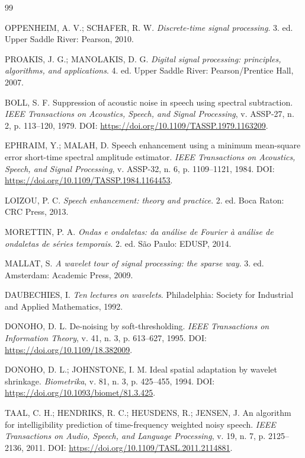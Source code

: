 \newpage
{}
\begin{thebibliography}{99}

 OPPENHEIM, A. V.; SCHAFER, R. W. \textit{Discrete-time signal processing}. 3. ed. Upper Saddle River: Pearson, 2010.

 PROAKIS, J. G.; MANOLAKIS, D. G. \textit{Digital signal processing: principles, algorithms, and applications}. 4. ed. Upper Saddle River: Pearson/Prentice Hall, 2007.

 BOLL, S. F. Suppression of acoustic noise in speech using spectral subtraction. \textit{IEEE Transactions on Acoustics, Speech, and Signal Processing}, v. ASSP-27, n. 2, p. 113--120, 1979. DOI: \url{https://doi.org/10.1109/TASSP.1979.1163209}.

 EPHRAIM, Y.; MALAH, D. Speech enhancement using a minimum mean-square error short-time spectral amplitude estimator. \textit{IEEE Transactions on Acoustics, Speech, and Signal Processing}, v. ASSP-32, n. 6, p. 1109--1121, 1984. DOI: \url{https://doi.org/10.1109/TASSP.1984.1164453}.

 LOIZOU, P. C. \textit{Speech enhancement: theory and practice}. 2. ed. Boca Raton: CRC Press, 2013.

 MORETTIN, P. A. \textit{Ondas e ondaletas: da análise de Fourier à análise de ondaletas de séries temporais}. 2. ed. São Paulo: EDUSP, 2014.

 MALLAT, S. \textit{A wavelet tour of signal processing: the sparse way}. 3. ed. Amsterdam: Academic Press, 2009.

 DAUBECHIES, I. \textit{Ten lectures on wavelets}. Philadelphia: Society for Industrial and Applied Mathematics, 1992.

 DONOHO, D. L. De-noising by soft-thresholding. \textit{IEEE Transactions on Information Theory}, v. 41, n. 3, p. 613--627, 1995. DOI: \url{https://doi.org/10.1109/18.382009}.

 DONOHO, D. L.; JOHNSTONE, I. M. Ideal spatial adaptation by wavelet shrinkage. \textit{Biometrika}, v. 81, n. 3, p. 425--455, 1994. DOI: \url{https://doi.org/10.1093/biomet/81.3.425}.

 TAAL, C. H.; HENDRIKS, R. C.; HEUSDENS, R.; JENSEN, J. An algorithm for intelligibility prediction of time-frequency weighted noisy speech. \textit{IEEE Transactions on Audio, Speech, and Language Processing}, v. 19, n. 7, p. 2125--2136, 2011. DOI: \url{https://doi.org/10.1109/TASL.2011.2114881}.


\end{thebibliography}
